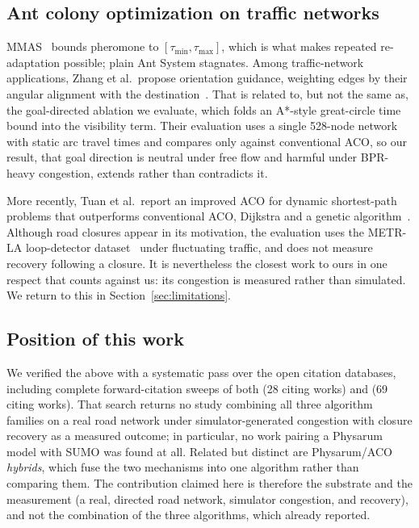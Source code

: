 \subsection{Ant colony optimization on traffic networks}

MMAS~\cite{stutzle2000maxmin} bounds pheromone to $[\tau_{\min},
\tau_{\max}]$, which is what makes repeated re-adaptation possible; plain Ant
System stagnates. Among traffic-network applications, Zhang et al.\ propose
orientation guidance, weighting edges by their angular alignment with the
destination~\cite{zhang2018novel}. That is related to, but not the same as,
the goal-directed ablation we evaluate, which folds an A*-style great-circle
time bound into the visibility term. Their evaluation uses a single 528-node
network with static arc travel times and compares only against conventional
ACO, so our result, that goal direction is neutral under free flow and harmful
under BPR-heavy congestion, extends rather than contradicts it.

More recently, Tuan et al.\ report an improved ACO for dynamic shortest-path
problems that outperforms conventional ACO, Dijkstra and a genetic
algorithm~\cite{tuan2026improved}. Although road closures appear in its
motivation, the evaluation uses the METR-LA loop-detector
dataset~\cite{li2018diffusion} under fluctuating traffic, and does not
measure recovery following a closure. It is nevertheless the closest work to
ours in one respect that counts against us: its congestion is measured
rather than simulated. We return to this in Section~\ref{sec:limitations}.

\subsection{Position of this work}

We verified the above with a systematic pass over the open citation
databases, including complete forward-citation sweeps of both
\cite{zhang2014improved} (28 citing works) and \cite{watanabe2011traffic}
(69 citing works). That search returns no study combining all three
algorithm families on a real road network under simulator-generated
congestion with closure recovery as a measured outcome; in particular, no
work pairing a Physarum model with SUMO was found at all. Related but
distinct are Physarum/ACO \emph{hybrids}, which fuse the two mechanisms into
one algorithm rather than comparing them. The contribution claimed here is
therefore the substrate and the measurement (a real, directed road network, simulator
congestion, and recovery), and not the combination of
the three algorithms, which \cite{zhang2014improved} already reported.
